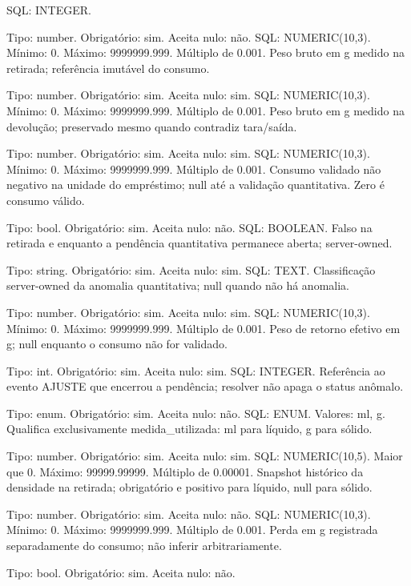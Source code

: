 \begin{description}
SQL: INTEGER.
\item[peso\_saida] Tipo: number. Obrigatório: sim. Aceita nulo: não.
SQL: NUMERIC(10,3).
Mínimo: 0.
Máximo: 9999999.999.
Múltiplo de 0.001.
Peso bruto em g medido na retirada; referência imutável do consumo.
\item[peso\_retorno] Tipo: number. Obrigatório: sim. Aceita nulo: sim.
SQL: NUMERIC(10,3).
Mínimo: 0.
Máximo: 9999999.999.
Múltiplo de 0.001.
Peso bruto em g medido na devolução; preservado mesmo quando contradiz tara/saída.
\item[medida\_utilizada] Tipo: number. Obrigatório: sim. Aceita nulo: sim.
SQL: NUMERIC(10,3).
Mínimo: 0.
Máximo: 9999999.999.
Múltiplo de 0.001.
Consumo validado não negativo na unidade do empréstimo; null até a validação quantitativa. Zero é consumo válido.
\item[consumo\_validado] Tipo: bool. Obrigatório: sim. Aceita nulo: não.
SQL: BOOLEAN.
Falso na retirada e enquanto a pendência quantitativa permanece aberta; server-owned.
\item[anomalia\_metrologica] Tipo: string. Obrigatório: sim. Aceita nulo: sim.
SQL: TEXT.
Classificação server-owned da anomalia quantitativa; null quando não há anomalia.
\item[peso\_retorno\_efetivo] Tipo: number. Obrigatório: sim. Aceita nulo: sim.
SQL: NUMERIC(10,3).
Mínimo: 0.
Máximo: 9999999.999.
Múltiplo de 0.001.
Peso de retorno efetivo em g; null enquanto o consumo não for validado.
\item[id\_resolucao\_metrologica] Tipo: int. Obrigatório: sim. Aceita nulo: sim.
SQL: INTEGER.
Referência ao evento AJUSTE que encerrou a pendência; resolver não apaga o status anômalo.
\item[unidade\_medida\_utilizada] Tipo: enum. Obrigatório: sim. Aceita nulo: não.
SQL: ENUM.
Valores: ml, g.
Qualifica exclusivamente medida\_utilizada: ml para líquido, g para sólido.
\item[densidade\_aplicada] Tipo: number. Obrigatório: sim. Aceita nulo: sim.
SQL: NUMERIC(10,5).
Maior que 0.
Máximo: 99999.99999.
Múltiplo de 0.00001.
Snapshot histórico da densidade na retirada; obrigatório e positivo para líquido, null para sólido.
\item[peso\_perda\_evaporacao] Tipo: number. Obrigatório: sim. Aceita nulo: não.
SQL: NUMERIC(10,3).
Mínimo: 0.
Máximo: 9999999.999.
Múltiplo de 0.001.
Perda em g registrada separadamente do consumo; não inferir arbitrariamente.
\item[uso\_vencido\_aceito] Tipo: bool. Obrigatório: sim. Aceita nulo: não.

\end{description}

